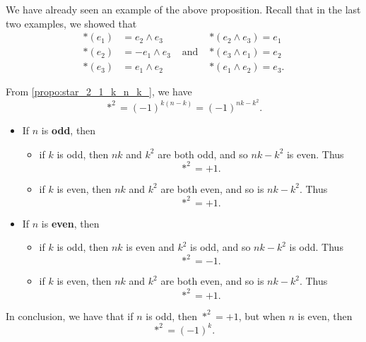 \documentclass[notoc,notitlepage]{tufte-book}
\begin{document}
\begin{eg}
  We have already seen an example of the above proposition. Recall that in the
  last two examples, we showed that
  \begin{align*}
    *(e_1) &= e_2 \land e_3  &              & *(e_2 \land e_3) = e_1 \\
    *(e_2) &= -e_1 \land e_3 & \text{ and } & *(e_3 \land e_1) = e_2 \\
    *(e_3) &= e_1 \land e_2  &              & *(e_1 \land e_2) = e_3.
  \end{align*}
\end{eg}

\begin{note}
  From \cref{propo:star_2_1_k_n_k_}, we have
  \begin{equation*}
    *^2 = (-1)^{k(n-k)} = (-1)^{nk - k^2}.
  \end{equation*}
  \begin{itemize}
    \item If $n$ is \textbf{odd}, then
      \begin{itemize}
        \item if $k$ is odd, then $nk$ and $k^2$ are both odd, and so $nk - k^2$ 
          is even. Thus
          \begin{equation*}
            *^2 = +1.
          \end{equation*}
        \item if $k$ is even, then $nk$ and $k^2$ are both even, and so is $nk -
          k^2$. Thus
          \begin{equation*}
            *^2 = +1.
          \end{equation*}
      \end{itemize}
    \item If $n$ is \textbf{even}, then
      \begin{itemize}
        \item if $k$ is odd, then $nk$ is even and $k^2$ is odd, and so $nk -
          k^2$ is odd. Thus
          \begin{equation*}
            *^2 = -1.
          \end{equation*}
        \item if $k$ is even, then $nk$ and $k^2$ are both even, and so is $nk -
          k^2$. Thus
          \begin{equation*}
            *^2 = +1.
          \end{equation*}
      \end{itemize}
  \end{itemize}

  In conclusion, we have that if $n$ is odd, then $*^2 = +1$, but when $n$ is
  even, then
  \begin{equation*}
    *^2 = (-1)^k.
  \end{equation*}
\end{note}
\end{document}
